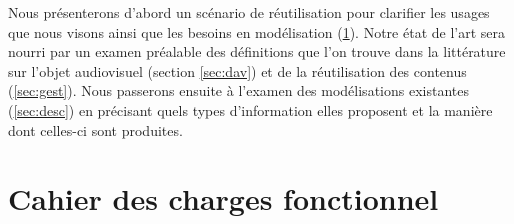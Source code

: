 Nous présenterons d'abord un scénario de réutilisation pour clarifier les usages que nous visons ainsi que les besoins en modélisation (\ref{sec:cdc-av}).
Notre état de l'art sera nourri par un examen préalable des définitions que l'on trouve dans la littérature sur l'objet audiovisuel (section \ref{sec:dav}) et de la réutilisation des contenus (\ref{sec:gest}).
Nous passerons ensuite à l'examen des modélisations existantes (\ref{sec:desc}) en précisant quels types d'information elles proposent et la manière dont celles-ci sont produites. 






\section{Cahier des charges fonctionnel}\label{sec:cdc-av}

